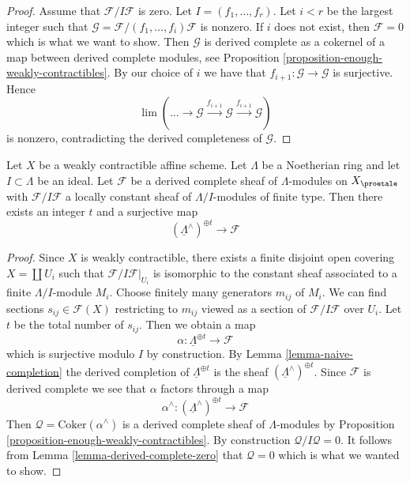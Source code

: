 \begin{proof}
Assume that $\mathcal{F}/I\mathcal{F}$ is zero.
Let $I = (f_1, \ldots, f_r)$. Let $i < r$ be the largest
integer such that $\mathcal{G} = \mathcal{F}/(f_1, \ldots, f_i)\mathcal{F}$
is nonzero. If $i$ does not exist, then $\mathcal{F} = 0$ which is what we
want to show. Then $\mathcal{G}$ is derived complete as a cokernel
of a map between derived complete modules, see
Proposition \ref{proposition-enough-weakly-contractibles}.
By our choice of $i$ we have that $f_{i + 1} : \mathcal{G} \to \mathcal{G}$
is surjective. Hence
$$
\lim (\ldots \to \mathcal{G} \xrightarrow{f_{i + 1}} \mathcal{G}
\xrightarrow{f_{i + 1}} \mathcal{G})
$$
is nonzero, contradicting the derived completeness of $\mathcal{G}$.
\end{proof}

\begin{lemma}
\label{lemma-derived-complete-limit}
Let $X$ be a weakly contractible affine scheme.
Let $\Lambda$ be a Noetherian ring and let $I \subset \Lambda$ be an ideal.
Let $\mathcal{F}$ be a derived complete sheaf of $\Lambda$-modules
on $X_\proetale$ with $\mathcal{F}/I\mathcal{F}$ a locally
constant sheaf of $\Lambda/I$-modules of finite type.
Then there exists an integer $t$ and a surjective map
$$
(\underline{\Lambda}^\wedge)^{\oplus t} \to \mathcal{F}
$$
\end{lemma}

\begin{proof}
Since $X$ is weakly contractible, there exists a finite disjoint open
covering $X = \coprod U_i$ such that $\mathcal{F}/I\mathcal{F}|_{U_i}$
is isomorphic to the constant sheaf associated to a finite $\Lambda/I$-module
$M_i$. Choose finitely many generators $m_{ij}$ of $M_i$. We
can find sections $s_{ij} \in \mathcal{F}(X)$ restricting to
$m_{ij}$ viewed as a section of $\mathcal{F}/I\mathcal{F}$ over $U_i$. 
Let $t$ be the total number of $s_{ij}$. Then we obtain a map
$$
\alpha : \underline{\Lambda}^{\oplus t} \longrightarrow \mathcal{F}
$$
which is surjective modulo $I$ by construction. By
Lemma \ref{lemma-naive-completion}
the derived completion of $\underline{\Lambda}^{\oplus t}$ is the
sheaf $(\underline{\Lambda}^\wedge)^{\oplus t}$. Since $\mathcal{F}$
is derived complete we see that $\alpha$ factors through a map
$$
\alpha^\wedge :
(\underline{\Lambda}^\wedge)^{\oplus t}
\longrightarrow
\mathcal{F}
$$
Then $\mathcal{Q} = \text{Coker}(\alpha^\wedge)$ is a derived complete
sheaf of $\Lambda$-modules by
Proposition \ref{proposition-enough-weakly-contractibles}.
By construction $\mathcal{Q}/I\mathcal{Q} = 0$. It follows from
Lemma \ref{lemma-derived-complete-zero}
that $\mathcal{Q} = 0$ which is what we wanted to show.
\end{proof}








